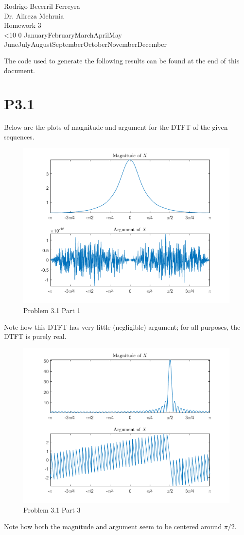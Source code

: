 \documentclass{article}
\renewcommand{\today}{\ifnum\number\day<10 0\fi \number\day \space%
\ifcase \month \or January\or February\or March\or April\or May%
\or June\or July\or August\or September\or October\or November\or December\fi\space%
\number \year}
\begin{document}
\noindent
Rodrigo Becerril Ferreyra\\
Dr. Alireza Mehrnia\\
Homework 3\\
\today

The code used to generate the following results can be found at the end of this document.


\section*{P3.1}
Below are the plots of magnitude and argument for the DTFT of the given sequences.
\begin{figure}[H]
    \centering
    \includegraphics[width=\textwidth]{html/Homework3_01.png}
    \caption{Problem 3.1 Part 1}
    \label{3.1.1}
\end{figure}
Note how this DTFT has very little (negligible) argument; for all purposes, the DTFT is purely real.

\begin{figure}[H]
    \centering
    \includegraphics[width=\textwidth]{html/Homework3_02.png}
    \caption{Problem 3.1 Part 3}
    \label{3.1.3}
\end{figure}
Note how both the magnitude and argument seem to be centered around \(\pi/2\).
\end{document}

